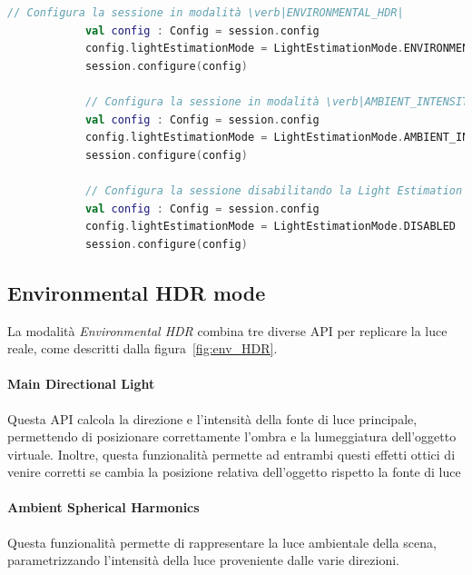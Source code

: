 \documentclass[crop=false, class=book]{standalone}
\begin{document}
	\begin{center}
		\begin{minipage}{0.95\textwidth}
			\begin{lstlisting}[caption={Configurazione della modalità di stima della luce.}, label={lst:le_session}, language=Kotlin]
			// Configura la sessione in modalità \verb|ENVIRONMENTAL_HDR|
			val config : Config = session.config
			config.lightEstimationMode = LightEstimationMode.ENVIRONMENTAL_HDR
			session.configure(config)
			
			// Configura la sessione in modalità \verb|AMBIENT_INTENSITY|
			val config : Config = session.config
			config.lightEstimationMode = LightEstimationMode.AMBIENT_INTENSITY
			session.configure(config)
				
			// Configura la sessione disabilitando la Light Estimation API
			val config : Config = session.config
			config.lightEstimationMode = LightEstimationMode.DISABLED
			session.configure(config)
			\end{lstlisting}
		\end{minipage}
	\end{center}


	

	\subsection{Environmental HDR mode}
		La modalità \textit{Environmental HDR} combina tre diverse API per replicare la luce reale, come descritti dalla figura~\vref{fig:env_HDR}.
	
		\paragraph*{Main Directional Light}
			Questa API calcola la direzione e l'intensità della fonte di luce principale, permettendo di posizionare correttamente l'ombra e la lumeggiatura dell'oggetto virtuale. Inoltre, questa funzionalità permette ad entrambi questi effetti ottici di venire corretti se cambia la posizione relativa dell'oggetto rispetto la fonte di luce
		
		\paragraph*{Ambient Spherical Harmonics}
			Questa funzionalità permette di rappresentare la luce ambientale della scena, parametrizzando l'intensità della luce proveniente dalle varie direzioni.
		
\end{document}
